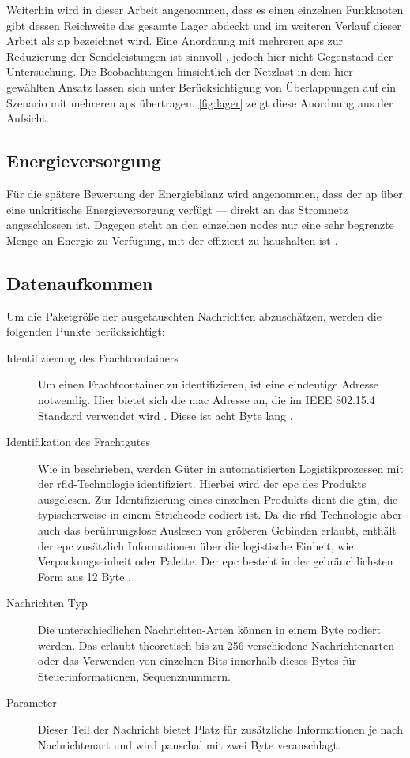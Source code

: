Weiterhin wird in dieser Arbeit angenommen, dass es einen einzelnen Funkknoten gibt dessen Reichweite das gesamte Lager abdeckt und im weiteren Verlauf dieser Arbeit als \ac{ap} bezeichnet wird. Eine Anordnung mit mehreren \acp{ap} zur Reduzierung der Sendeleistungen ist sinnvoll \citep{Falkenberg2017b}, jedoch hier nicht Gegenstand der Untersuchung. Die Beobachtungen hinsichtlich der Netzlast in dem hier gewählten Ansatz lassen sich unter Berücksichtigung von Überlappungen auf ein Szenario mit mehreren \acsp{ap} übertragen. \autoref{fig:lager} zeigt diese Anordnung aus der Aufsicht.

\subsection{Energieversorgung}
Für die spätere Bewertung der Energiebilanz wird angenommen, dass der \ac{ap} über eine unkritische Energieversorgung verfügt --- \zB direkt an das Stromnetz angeschlossen ist. Dagegen steht an den einzelnen \glspl{node} nur eine sehr begrenzte Menge an Energie zu Verfügung, mit der effizient zu haushalten ist \cite{inBin}.

\subsection{Datenaufkommen} \label{kap:systembeschreibung_sek:datenaufkommen}
Um die Paketgröße der ausgetauschten Nachrichten abzuschätzen, werden die folgenden Punkte berücksichtigt:
\begin{description}
	\item[Identifizierung des Frachtcontainers] Um einen Frachtcontainer zu identifizieren, ist eine eindeutige Adresse notwendig. Hier bietet sich die \ac{mac} Adresse an, die im  IEEE 802.15.4 Standard verwendet wird \cite{ieee}. Diese ist acht Byte lang \cite[151]{ieee}.
	\item[Identifikation des Frachtgutes] Wie in \citep{inBin} beschrieben, werden Güter in automatisierten Logistikprozessen mit der \acs{rfid}-Technologie identifiziert. Hierbei wird der \acf{epc} des Produkts ausgelesen. Zur Identifizierung eines einzelnen Produkts dient die \acf{gtin}, die typischerweise in einem Strichcode codiert ist. Da die  \acs{rfid}-Technologie aber auch das berührungslose Auslesen von größeren Gebinden erlaubt, enthält der \acs{epc} zusätzlich Informationen über die logistische Einheit, wie \zB Verpackungseinheit oder Palette. Der \acs{epc} besteht in der gebräuchlichsten Form aus 12 Byte \citep{epc}. 
	\item[Nachrichten Typ] Die unterschiedlichen Nachrichten-Arten können in einem Byte codiert werden. Das erlaubt theoretisch bis zu 256 verschiedene Nachrichtenarten oder das Verwenden von einzelnen Bits innerhalb dieses Bytes für Steuerinformationen, \zB Sequenznummern.
	\item[Parameter] Dieser Teil der Nachricht bietet Platz für zusätzliche Informationen je nach Nachrichtenart und wird pauschal mit zwei Byte veranschlagt.
\end{description}

